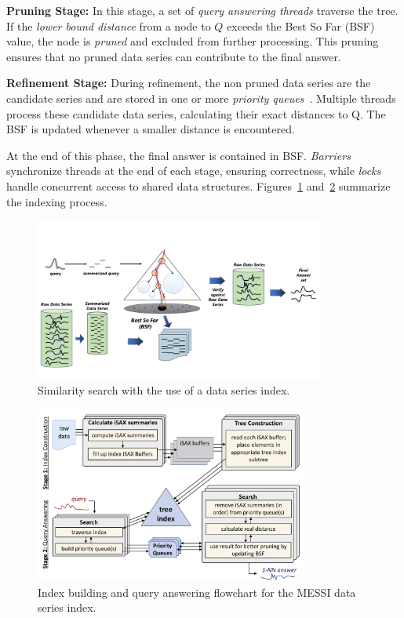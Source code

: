 \noindent\textbf{Pruning Stage:} In this stage, a set of \textit{query answering threads}
traverse the tree. If the \textit{lower bound distance} from a node to $Q$
exceeds the Best So Far (BSF) value, the node is \textit{pruned} and excluded from
further processing. This pruning ensures that no pruned data series can contribute
to the final answer.

\noindent\textbf{Refinement Stage:} During refinement, the non pruned data series 
are the candidate series and are stored in one or more \textit{priority queues}~\cite{parisplus,PFP21-I,PFP21-II}.
Multiple threads process these candidate data series, calculating their exact
distances to Q. The BSF is updated whenever a smaller distance is encountered.

At the end of this phase, the final answer is contained in BSF.  
\textit{Barriers} synchronize threads at the end of each stage, ensuring correctness,  
while \textit{locks} handle concurrent access to shared data structures.  
Figures~\ref{fig:example} and~\ref{fig:example2} summarize the indexing process.  

\begin{figure}[H]
    \centering
    \includegraphics[width=0.85\textwidth]{figures/prelem/iSAX-index.pdf}
    \caption{Similarity search with the use of a data series index.}
    \label{fig:example}
    \vspace{-0.5cm} %
\end{figure}

\begin{figure}[H]
    \centering
    \includegraphics[width=0.8\textwidth]{figures/prelem/flowchart2.pdf}
    \caption{Index building and query answering flowchart for the MESSI data series index.}
    \label{fig:example2}
    \vspace{-0.5cm} %
\end{figure}


